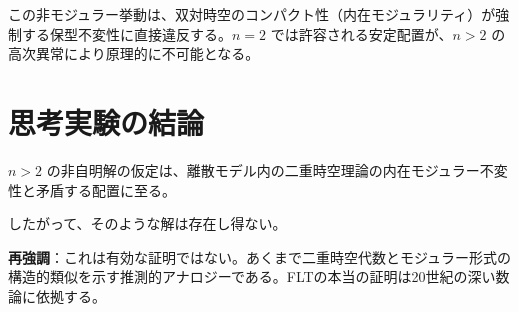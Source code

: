 \documentclass[a4paper]{article}
\begin{document}
この非モジュラー挙動は、双対時空のコンパクト性（内在モジュラリティ）が強制する保型不変性に直接違反する。$n=2$ では許容される安定配置が、$n > 2$ の高次異常により原理的に不可能となる。

\section{思考実験の結論}

$n>2$ の非自明解の仮定は、離散モデル内の二重時空理論の内在モジュラー不変性と矛盾する配置に至る。

したがって、そのような解は存在し得ない。

\textbf{再強調}：これは有効な証明ではない。あくまで二重時空代数とモジュラー形式の構造的類似を示す推測的アナロジーである。FLTの本当の証明は20世紀の深い数論に依拠する。
\end{document}
